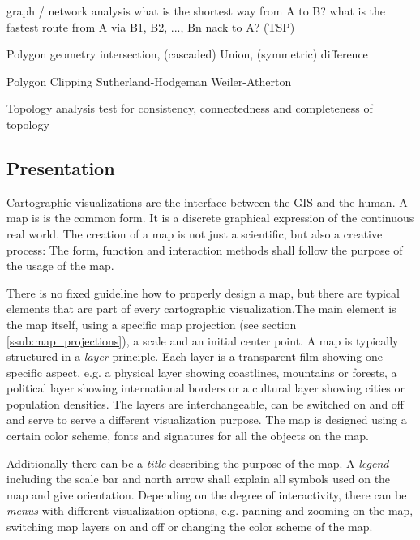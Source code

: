 graph / network analysis
  what is the shortest way from A to B?
  what is the fastest route from A via B1, B2, ..., Bn nack to A? (TSP)

Polygon geometry
  intersection, (cascaded) Union, (symmetric) difference

Polygon Clipping
  Sutherland-Hodgeman
  Weiler-Atherton

Topology analysis
  test for consistency, connectedness and completeness of topology



\subsection{Presentation} %
\label{sub:presentation}

Cartographic visualizations are the interface between the GIS and the human. A map is is the common form. It is a discrete graphical expression of the continuous real world. The creation of a map is not just a scientific, but also a creative process: The form, function and interaction methods shall follow the purpose of the usage of the map.

There is no fixed guideline how to properly design a map, but there are typical elements that are part of every cartographic visualization.The main element is the map itself, using a specific map projection (see section \ref{ssub:map_projections}), a scale and an initial center point. A map is typically structured in a \emph{layer} principle. Each layer is a transparent film showing one specific aspect, e.g. a physical layer showing coastlines, mountains or forests, a political layer showing international borders or a cultural layer showing cities or population densities. The layers are interchangeable, can be switched on and off and serve to serve a different visualization purpose. The map is designed using a certain color scheme, fonts and signatures for all the objects on the map.

Additionally there can be a \emph{title} describing the purpose of the map. A \emph{legend} including the scale bar and north arrow shall explain all symbols used on the map and give orientation. Depending on the degree of interactivity, there can be \emph{menus} with different visualization options, e.g. panning and zooming on the map, switching map layers on and off or changing the color scheme of the map.
\cite[pp. 159-166]{bolstad2008gis}


